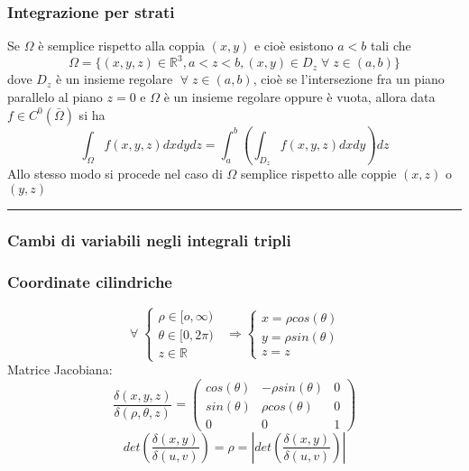 \subsubsection*{Integrazione per strati}
Se $\Omega$ è semplice rispetto alla coppia $(x,y)$ e cioè esistono $a<b$ tali che
\[
    \Omega = \{(x,y,z) \in \mathbb{R}^3, a<z<b, (x,y) \in D_z \;\forall\;z \in(a,b)\}
\]
dove $D_z$ è un insieme regolare $\;\forall\;z \in(a,b)$, cioè se l'intersezione fra un piano parallelo al piano $z=0$ e $\Omega$ è un insieme regolare oppure è vuota, allora data $f \in C^0(\bar{\Omega})$ si ha 
\[
    \int_\Omega f(x,y,z) dxdydz = \int_{a}^{b}\left(\int_{D_z}f(x,y,z)dxdy\right)dz
\]
Allo stesso modo si procede nel caso di $\Omega$ semplice rispetto alle coppie $(x,z)$ o $(y,z)$\newline
\rule{\textwidth}{0,4pt}
\subsubsection*{Cambi di variabili negli integrali tripli}
\subsubsection*{Coordinate cilindriche}
\[
    \;\forall\; \begin{cases}
        \rho \in [o,\infty)\\
        \theta \in [0,2\pi)\\
        z \in \mathbb{R}
    \end{cases} \;\; \Longrightarrow \begin{cases}
        x = \rho cos(\theta)\\
        y = \rho sin(\theta)\\
        z = z
    \end{cases}
\]
Matrice Jacobiana:
\[
    \frac{\delta(x,y,z)}{\delta(\rho,\theta,z)} = \left(
    \begin{matrix}
        cos(\theta) & -\rho sin(\theta) & 0\\ 
        sin(\theta) & \rho cos(\theta) & 0 \\ 
        0 & 0 & 1
    \end{matrix}\right)
\]
\[
    det(\frac{\delta(x,y)}{\delta(u,v)}) = \rho = \left|det(\frac{\delta(x,y)}{\delta(u,v)})\right|
\]
